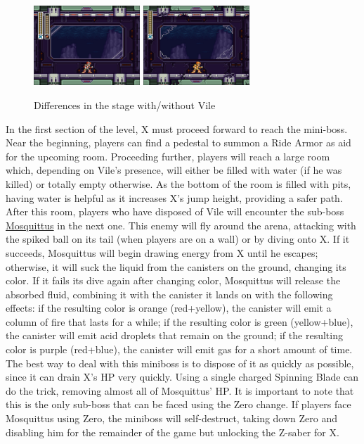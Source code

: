 \begin{figure}[htp]
	\centering
	\includegraphics[height=3cm]{figures/X3/Doppler_stages/dopp_B_1.jpg}
	\includegraphics[height=3cm]{figures/X3/Doppler_stages/dopp_B_2.jpg}
	\caption{Differences in the stage with/without Vile}
\end{figure}

In the first section of the level, X must proceed forward to reach the mini-boss. Near the beginning, players can find a pedestal to summon a Ride Armor as aid for the upcoming room. Proceeding further, players will reach a large room which, depending on Vile's presence, will either be filled with water (if he was killed) or totally empty otherwise. As the bottom of the room is filled with pits, having water is helpful as it increases X's jump height, providing a safer path. After this room, players who have disposed of Vile will encounter the sub-boss \hyperlink{miniboss:Mosquittus}{Mosquittus} in the next one. This enemy will fly around the arena, attacking with the spiked ball on its tail (when players are on a wall) or by diving onto X. If it succeeds, Mosquittus will begin drawing energy from X until he escapes; otherwise, it will suck the liquid from the canisters on the ground, changing its color. If it fails its dive again after changing color, Mosquittus will release the absorbed fluid, combining it with the canister it lands on with the following effects: if the resulting color is orange (red+yellow), the canister will emit a column of fire that lasts for a while; if the resulting color is green (yellow+blue), the canister will emit acid droplets that remain on the ground; if the resulting color is purple (red+blue), the canister will emit gas for a short amount of time. The best way to deal with this miniboss is to dispose of it as quickly as possible, since it can drain X's HP very quickly. Using a single charged Spinning Blade can do the trick, removing almost all of Mosquittus' HP. It is important to note that this is the only sub-boss that can be faced using the Zero change. If players face Mosquittus using Zero, the miniboss will self-destruct, taking down Zero and disabling him for the remainder of the game but unlocking the Z-saber for X.

